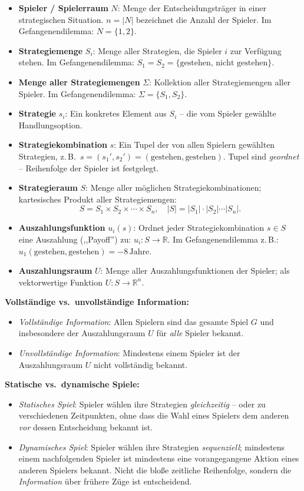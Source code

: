 \begin{itemize}[leftmargin=1.5em]
    \item \textbf{Spieler / Spielerraum} $N$: Menge der Entscheidungsträger in einer strategischen Situation. $n = |N|$ bezeichnet die Anzahl der Spieler. Im Gefangenendilemma: $N = \{1, 2\}$.
    \item \textbf{Strategiemenge} $S_i$: Menge aller Strategien, die Spieler $i$ zur Verfügung stehen. Im Gefangenendilemma: $S_1 = S_2 = \{\text{gestehen},\, \text{nicht gestehen}\}$.
    \item \textbf{Menge aller Strategiemengen} $\Sigma$: Kollektion aller Strategiemengen aller Spieler. Im Gefangenendilemma: $\Sigma = \{S_1, S_2\}$.
    \item \textbf{Strategie} $s_i$: Ein konkretes Element aus $S_i$ -- die vom Spieler gewählte Handlungsoption.
    \item \textbf{Strategiekombination} $s$: Ein Tupel der von allen Spielern gewählten Strategien, z.\,B.\ $s = (s_1', s_2') = (\text{gestehen}, \text{gestehen})$. Tupel sind \emph{geordnet} -- Reihenfolge der Spieler ist festgelegt.
    \item \textbf{Strategieraum} $S$: Menge aller möglichen Strategiekombinationen; kartesisches Produkt aller Strategiemengen:
    \[
    S = S_1 \times S_2 \times \cdots \times S_n, \quad |S| = |S_1| \cdot |S_2| \cdots |S_n|.
    \]
    \item \textbf{Auszahlungsfunktion} $u_i(s)$: Ordnet jeder Strategiekombination $s \in S$ eine Auszahlung (,,Payoff'') zu: $u_i: S \to \mathbb{R}$. Im Gefangenendilemma z.\,B.: $u_1(\text{gestehen}, \text{gestehen}) = -8\,\text{Jahre}$.
    \item \textbf{Auszahlungsraum} $U$: Menge aller Auszahlungsfunktionen der Spieler; als vektorwertige Funktion $U: S \to \mathbb{R}^n$.
\end{itemize}

\textbf{Vollständige vs.\ unvollständige Information:}
\begin{itemize}[leftmargin=1.5em]
    \item \textit{Vollständige Information}: Allen Spielern sind das gesamte Spiel $G$ und insbesondere der Auszahlungsraum $U$ für \emph{alle} Spieler bekannt.
    \item \textit{Unvollständige Information}: Mindestens einem Spieler ist der Auszahlungsraum $U$ nicht vollständig bekannt.
\end{itemize}

\textbf{Statische vs.\ dynamische Spiele:}
\begin{itemize}[leftmargin=1.5em]
    \item \textit{Statisches Spiel}: Spieler wählen ihre Strategien \emph{gleichzeitig} -- oder zu verschiedenen Zeitpunkten, ohne dass die Wahl eines Spielers dem anderen \emph{vor} dessen Entscheidung bekannt ist.
    \item \textit{Dynamisches Spiel}: Spieler wählen ihre Strategien \emph{sequenziell}; mindestens einem nachfolgenden Spieler ist mindestens eine vorangegangene Aktion eines anderen Spielers bekannt. Nicht die bloße zeitliche Reihenfolge, sondern die \emph{Information} über frühere Züge ist entscheidend.
\end{itemize}

